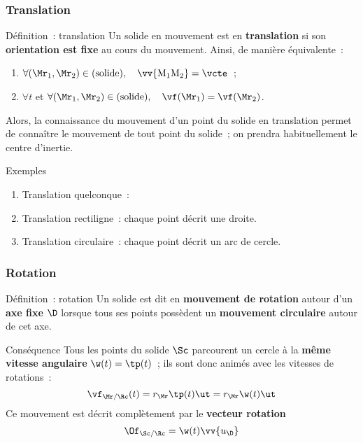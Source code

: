 \documentclass[../main/main.tex]{subfiles}
\begin{document}
\subsubsection{Translation}
\begin{tdefi}{Définition~: translation}
    Un solide en mouvement est en \textbf{translation} si son
    \textbf{orientation est fixe} au cours du mouvement. Ainsi, de manière
    équivalente~:
    \begin{enumerate}
        \item $\forall (\Mr_1,\Mr_2) \in ({\rm solide}), \quad \vv{\rm M_1M_2} =
            \vcte$~;
        \item $\forall t$ et $\forall (\Mr_1,\Mr_2) \in ({\rm solide}), \quad
            \vf(\Mr_1) = \vf(\Mr_2)$.
    \end{enumerate}
    Alors, la connaissance du mouvement d'un point du solide en translation
    permet de connaître le mouvement de tout point du solide~; on prendra
    habituellement le centre d'inertie.
\end{tdefi}

\begin{rexem}{Exemples}
    \begin{enumerate}
        \item Translation quelconque~:
        \item Translation rectiligne~: chaque point décrit une droite.
        \item Translation circulaire~: chaque point décrit un arc de cercle.
    \end{enumerate}
\end{rexem}

\subsubsection{Rotation}
\begin{tdefi}{Définition~: rotation}
    Un solide est dit en \textbf{mouvement de rotation} autour d'un \textbf{axe
    fixe} $\D$ lorsque tous ses points possèdent un \textbf{mouvement
    circulaire} autour de cet axe.
\end{tdefi}
\begin{tcoro}{Conséquence}
    Tous les points du solide $\Sc$ parcourent un cercle à la \textbf{même
    vitesse angulaire} $\w(t) = \tp(t)$~; ils sont donc animés avec les vitesses
    de rotations~:
    \[\vf_{\Mr/\Rc}(t) = r_{\Mr}\tp(t)\ut = r_{\Mr}\w(t)\ut\]
    Ce mouvement est décrit complètement par le \textbf{vecteur rotation}
    \[\Of_{\Sc/\Rc} = \w(t)\vv{u_\D}\]
\end{tcoro}
\end{document}
